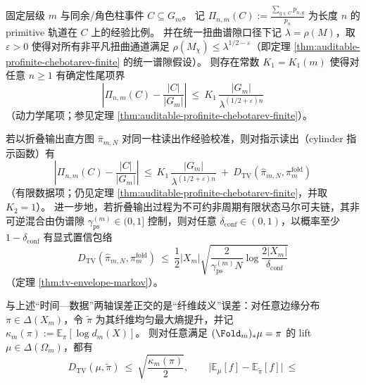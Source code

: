 \begin{theorem}\label{thm:prefix-readout-orthogonal-error-decomposition}
固定层级 \(m\) 与同余/角色柱事件 \(C\subseteq G_m\)。
记 \(\Pi_{n,m}(C):=\frac{\sum_{g\in C}p_{n,g}}{p_n}\) 为长度 \(n\) 的 primitive 轨道在 \(C\) 上的经验比例。
并在统一扭曲谱隙口径下记 \(\lambda=\rho(M)\)，取 \(\varepsilon>0\) 使得对所有非平凡扭曲通道满足 \(\rho(M_\chi)\le \lambda^{1/2-\varepsilon}\)（即定理 \ref{thm:auditable-profinite-chebotarev-finite} 的统一谱隙假设）。
则存在常数 \(K_1=K_1(m)\) 使得对任意 \(n\ge 1\) 有确定性尾项界
\begin{equation}\label{eq:prefix-tail-term}
\boxed{\;
\left|\Pi_{n,m}(C)-\frac{|C|}{|G_m|}\right|
\ \le\
K_1\,\frac{|G_m|}{\lambda^{(1/2+\varepsilon)n}}\;}
\end{equation}
（动力学尾项；参见定理 \ref{thm:auditable-profinite-chebotarev-finite}）。
\par
若以折叠输出直方图 \(\hat{\pi}_{m,N}\) 对同一柱读出作经验校准，则对指示读出（cylinder 指示函数）有
\begin{equation}\label{eq:prefix-tail-plus-data}
\boxed{\;
\left|\Pi_{n,m}(C)-\frac{|C|}{|G_m|}\right|
\ \le\
K_1\,\frac{|G_m|}{\lambda^{(1/2+\varepsilon)n}}
\ +\
D_{\mathrm{TV}}(\hat{\pi}_{m,N},\pi_m^{\mathrm{fold}})\;}
\end{equation}
（有限数据项；仍见定理 \ref{thm:auditable-profinite-chebotarev-finite}，并取 \(K_2=1\)）。
进一步地，若折叠输出过程为不可约非周期有限状态马尔可夫链，其非可逆混合由伪谱隙 \(\gamma_{\mathrm{ps}}^{(m)}\in(0,1]\) 控制，则对任意 \(\delta_{\mathrm{conf}}\in(0,1)\)，以概率至少 \(1-\delta_{\mathrm{conf}}\) 有显式置信包络
\begin{equation}\label{eq:prefix-data-envelope}
\boxed{\;
D_{\mathrm{TV}}(\hat{\pi}_{m,N},\pi_m^{\mathrm{fold}})
\ \le\
\frac12|X_m|\sqrt{\frac{2}{\gamma_{\mathrm{ps}}^{(m)}N}\log\frac{2|X_m|}{\delta_{\mathrm{conf}}}}\;}
\end{equation}
（定理 \ref{thm:tv-envelope-markov}）。
\par
与上述“时间—数据”两轴误差正交的是“纤维歧义”误差：对任意边缘分布 \(\pi\in\Delta(X_m)\)，令 \(\widetilde\pi\) 为其纤维均匀最大熵提升，并记
\(
\kappa_m(\pi):=\mathbb{E}_\pi[\log d_m(X)]
\)。
则对任意满足 \((\Fold_m)_*\mu=\pi\) 的 lift \(\mu\in\Delta(\Omega_m)\)，都有
\begin{equation}\label{eq:prefix-fiber-term}
\boxed{\;
D_{\mathrm{TV}}(\mu,\widetilde\pi)\ \le\ \sqrt{\frac{\kappa_m(\pi)}{2}},
\qquad
\bigl|\mathbb{E}_\mu[f]-\mathbb{E}_{\widetilde\pi}[f]\bigr|
\ \le\
}
\end{equation}
\end{theorem}
